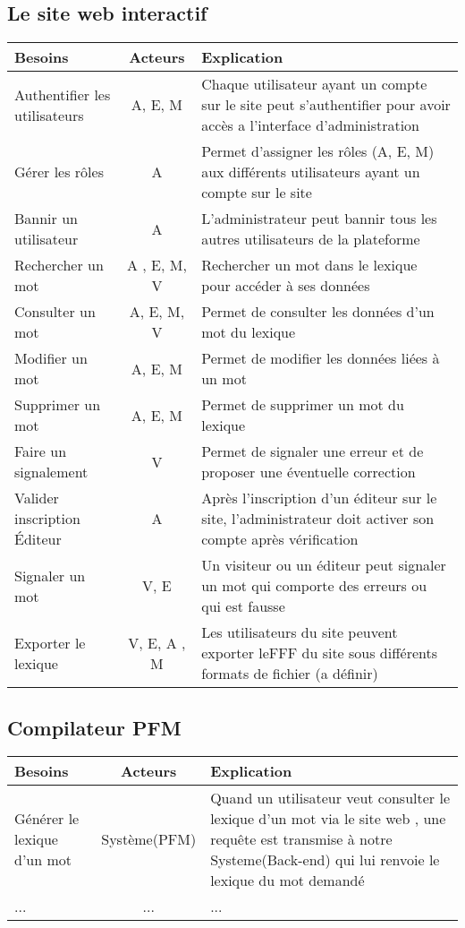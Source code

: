 \documentclass[12pt,a4paper]{article}
\begin{document}
\subsection{Le site web interactif}
\begin{tabularx}{\textwidth}{|l|c|X|}
  \hline
  \textbf{Besoins} & 
  \textbf{Acteurs} & 
  \textbf{Explication} \\
  \hline
  Authentifier les utilisateurs & 
  A, E, M & 
  Chaque utilisateur ayant un compte sur le site peut s'authentifier pour avoir accès a l'interface d'administration \\ 
  \hline
  Gérer les rôles & 
  A & 
  Permet d'assigner les rôles (A, E, M) aux différents utilisateurs ayant un compte sur le site \\
  \hline
  Bannir un utilisateur& 
  A & 
  L'administrateur peut bannir tous les autres utilisateurs de la plateforme \\
  \hline
  Rechercher un mot & 
  A , E, M, V & 
  Rechercher un mot dans le lexique pour accéder à ses données \\
  \hline
  Consulter un mot &
  A, E, M, V &
  Permet de consulter les données d'un mot du lexique \\
  \hline
  Modifier un mot &
  A, E, M & 
  Permet de modifier les données liées à un mot \\
  \hline
  Supprimer un mot &
  A, E, M & 
  Permet de supprimer un mot du lexique \\
  \hline
  Faire un signalement & 
  V &
  Permet de signaler une erreur et de proposer une éventuelle correction \\
  \hline
  Valider inscription Éditeur &
  A &
  Après l'inscription d'un éditeur sur le site, l'administrateur doit activer son compte après vérification \\
  \hline
  Signaler un mot &
  V, E &
  Un visiteur ou un éditeur peut signaler un mot qui comporte des erreurs ou qui est fausse \\
  \hline
  Exporter le lexique &
  V, E, A , M &
  Les utilisateurs du site peuvent exporter leFFF du site sous différents formats de fichier (a définir)\\
  \hline
\end{tabularx}

\subsection{Compilateur PFM}
\begin{tabularx}{\textwidth}{|l|c|X|}
  \hline
  Besoins & Acteurs & Explication \\
  \hline
  Générer le lexique d'un mot &
  Système(PFM)
  & Quand un utilisateur veut consulter le lexique d'un mot via le site web , une requête est transmise à notre Systeme(Back-end) qui lui renvoie le lexique du mot demandé \\
  \hline
  ...
  & ... 
  & ... \\

  \hline
\end{tabularx}
\end{document}
